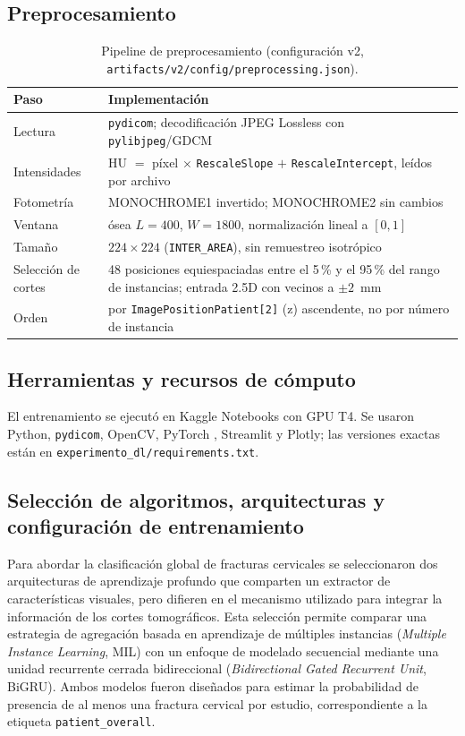 \subsection{Preprocesamiento}
\begin{table}[H]\centering\small
\begin{tabular}{p{3cm}p{10.5cm}}\toprule
Paso & Implementaci\'on \\\midrule
Lectura & \texttt{pydicom}; decodificaci\'on JPEG Lossless con \texttt{pylibjpeg}/GDCM \\
Intensidades & HU $=$ p\'ixel $\times$ \texttt{RescaleSlope} $+$ \texttt{RescaleIntercept}, le\'idos por archivo \\
Fotometr\'ia & MONOCHROME1 invertido; MONOCHROME2 sin cambios \\
Ventana & \'osea $L=400$, $W=1800$, normalizaci\'on lineal a $[0,1]$ \\
Tama\~no & $224\times224$ (\texttt{INTER\_AREA}), sin remuestreo isotr\'opico \\
Selecci\'on de cortes & 48 posiciones equiespaciadas entre el 5\,\% y el 95\,\% del rango de instancias; entrada 2.5D con vecinos a $\pm2$~mm \\
Orden & por \texttt{ImagePositionPatient[2]} (z) ascendente, no por n\'umero de instancia \\\bottomrule
\end{tabular}
\caption{Pipeline de preprocesamiento (configuraci\'on v2, \texttt{artifacts/\allowbreak v2/\allowbreak config/\allowbreak preprocessing.json}).}
\end{table}

\subsection{Herramientas y recursos de c\'omputo}
El entrenamiento se ejecut\'o en Kaggle Notebooks con GPU T4. Se usaron Python, \texttt{pydicom}, OpenCV, PyTorch \citep{paszke2019pytorch}, Streamlit y Plotly; las versiones exactas est\'an en \texttt{experimento\_dl/requirements.txt}.

\subsection{Selecci\'on de algoritmos, arquitecturas y configuraci\'on de entrenamiento}
Para abordar la clasificación global de fracturas cervicales se seleccionaron dos arquitecturas de aprendizaje profundo que comparten un extractor de características visuales, pero difieren en el mecanismo utilizado para integrar la información de los cortes tomográficos. Esta selección permite comparar una estrategia de agregación basada en aprendizaje de múltiples instancias (\textit{Multiple Instance Learning}, MIL) con un enfoque de modelado secuencial mediante una unidad recurrente cerrada bidireccional (\textit{Bidirectional Gated Recurrent Unit}, BiGRU). Ambos modelos fueron diseñados para estimar la probabilidad de presencia de al menos una fractura cervical por estudio, correspondiente a la etiqueta \texttt{patient\_overall}.

